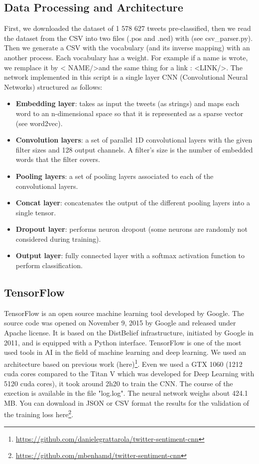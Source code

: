\documentclass{acmtog} %
\begin{document}
\subsection{Data Processing and Architecture}
\label{subsub:dl}

First, we downloaded the dataset of 1 578 627 tweets pre-classified, then we read the dataset from the CSV into two files (.pos and .ned) with (see csv\_parser.py). Then we generate a CSV with the vocabulary (and its inverse mapping) with an another process. Each vocabulary has a weight.
For example if a name is wrote, we remplace it by \textless 
NAME/\textgreater and the same thing for a link : \textless LINK/\textgreater.
The network implemented in this script is a single layer CNN (Convolutional Neural Networks)  structured as follows:
\begin{itemize}
\item  \textbf{Embedding layer}: takes as input the tweets (as strings) and maps each word to an n-dimensional space so that it is represented as a sparse vector (see word2vec).
\item  \textbf{Convolution layers}: a set of parallel 1D convolutional layers with the given filter sizes and 128 output channels. A filter's size is the number of embedded words that the filter covers.
\item  \textbf{Pooling layers}: a set of pooling layers associated to each of the convolutional layers.
\item  \textbf{Concat layer}: concatenates the output of the different pooling layers into a single tensor.
\item  \textbf{Dropout layer}: performs neuron dropout (some neurons are randomly not considered during training).
\item  \textbf{Output layer}: fully connected layer with a softmax activation function to perform classification.
\end{itemize}

\subsection{TensorFlow}
\label{subsub:dl}

TensorFlow is an open source machine learning tool developed by Google. The source code was opened on November 9, 2015 by Google and released under Apache license.
It is based on the DistBelief infrastructure, initiated by Google in 2011, and is equipped with a Python interface.
TensorFlow is one of the most used tools in AI in the field of machine learning and deep learning.
We used an architecture based on previous work (here)\footnote{\url{https://github.com/danielegrattarola/twitter-sentiment-cnn}}.
Even we used a GTX 1060 (1212 cuda cores compared to the Titan V which was developed for Deep Learning with 5120 cuda cores), it took around 2h20 to train the CNN.
The course of the exection is available in the file "log.log".
The neural network weighs about 424.1 MB.
You can download in JSON or CSV format the results for the validation of the training loss here\footnote{\url{https://github.com/mbenhamd/twitter-sentiment-cnn}}.
\end{document}
